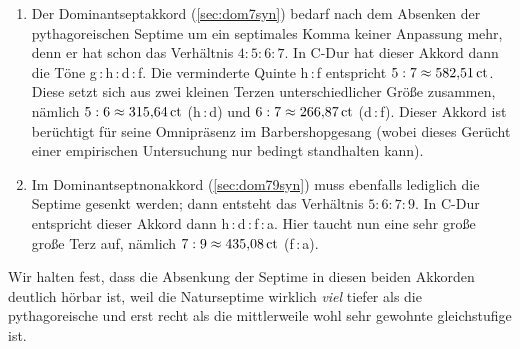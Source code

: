 \begin{enumerate}
\item Der Dominantseptakkord (\cref{sec:dom7syn}) bedarf nach dem Absenken der
  pythagoreischen Septime um ein septimales Komma keiner Anpassung mehr, denn er
  hat schon das Verhältnis $4:5:6:7$. In C-Dur hat dieser Akkord dann die Töne
  g\,:\,\naturalm h\,:\,d\,:\,\septimal f.  Die verminderte Quinte \naturalm
  h\,:\,\septimal f entspricht $5:7 \approx 582{,}51\,\text{ct}$.  Diese setzt sich aus
  zwei kleinen Terzen unterschiedlicher Größe zusammen, nämlich
  $5:6 \approx 315{,}64\,\text{ct}$ (\naturalm h\,:\,d) und $6:7\approx 266{,}87\,\text{ct}$
  (d\,:\,\septimal f).  Dieser Akkord ist berüchtigt für seine Omnipräsenz im
  Barbershopgesang (wobei dieses Gerücht einer empirischen Untersuchung
  \cite{Barbershop} nur bedingt standhalten kann).  
\item Im Dominantseptnonakkord (\cref{sec:dom79syn}) muss ebenfalls lediglich
  die Septime gesenkt werden; dann entsteht das Verhältnis $5:6:7:9$. In C-Dur
  entspricht dieser Akkord dann \naturalm h\,:\,d\,:\,\septimal f\,:\,a.  Hier
  taucht nun eine sehr große große Terz auf, nämlich $7:9\approx 435{,}08\,\text{ct}$
  (\septimal f\,:\,a).
\end{enumerate}
Wir halten fest, dass die Absenkung der Septime in diesen beiden Akkorden
deutlich hörbar ist, weil die Naturseptime wirklich \emph{viel} tiefer als die
pythagoreische und erst recht als die mittlerweile wohl sehr gewohnte
gleichstufige ist.

